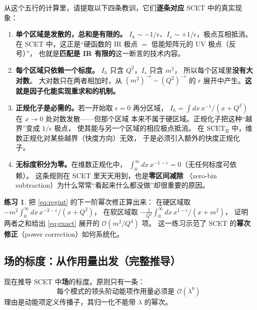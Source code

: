 \documentclass[UTF8,a4paper,11pt]{ctexart}
\theoremstyle{definition}
\newtheorem{exercise}{练习}[section]
\theoremstyle{remark}
\theoremstyle{plain}
\newcommand{\SCETII}{\text{SCET}_{\mathrm{II}}}
\newcommand{\en}[1]{\textsf{#1}}   %
\begin{document}
从这个五行的计算里，请提取以下四条教训，它们\textbf{逐条对应} SCET 中的真实现象：

\begin{enumerate}[label=(\arabic*)]
  \item \textbf{单个区域是发散的，总和是有限的。}
        $I_h\sim-1/\epsilon$、$I_s\sim+1/\epsilon$，极点互相抵消。
        在 SCET 中，这正是“硬函数的 IR 极点 $=$ 低能矩阵元的 UV 极点（反号）”，
        也就是\textbf{匹配是 IR 有限的}这一断言的技术内容。
  \item \textbf{每个区域只依赖一个标度。}
        $I_h$ 只含 $Q^2$，$I_s$ 只含 $m^2$，
        所以每个区域里\textbf{没有大对数}。
        大对数只在两者相加时，从 $(m^2)^{-\epsilon}-(Q^2)^{-\epsilon}$ 的
        $\epsilon$ 展开中产生。\textbf{这就是因子化能实现重求和的机制。}
  \item \textbf{正规化子是必需的。}若一开始取 $\epsilon=0$ 再分区域，
        $I_h=\int dx\,x^{-1}/(x+Q^2)$ 在 $x\to0$ 处对数发散——但那个区域
        本来不属于硬区域。正规化子把这种“越界”变成 $1/\epsilon$ 极点，
        使其能与另一个区域的相应极点抵消。
        在 $\SCETII$ 中，维数正规化对某些越界（快度方向）无效，
        于是必须引入额外的快度正规化子。
  \item \textbf{无标度积分为零。}在维数正规化中，
        $\int_0^\infty dx\,x^{-1-\epsilon}=0$（无任何标度可依赖）。
        这条规则在 SCET 里天天用到，也是\textbf{零区间减除}
        （\en{zero-bin subtraction}）为什么常常“看起来什么都没做”却很重要的原因。
\end{enumerate}

\begin{exercise}
把 \eqref{eq:regint} 的下一阶幂次修正算出来：
在硬区域取 $-m^2\!\int_0^\infty dx\,x^{-2-\epsilon}/(x+Q^2)$，
在软区域取 $-\frac{1}{Q^4}\!\int_0^\infty dx\,x^{1-\epsilon}/(x+m^2)$，
证明两者之和给出 \eqref{eq:exact} 展开的 $\mathcal O(m^2/Q^4)$ 项。
这一练习示范了 SCET 的\textbf{幂次修正}（\en{power correction}）如何系统化。
\end{exercise}

\subsection{场的标度：从作用量出发（完整推导）}
\label{subsec:fieldscaling}

现在推导 SCET 中\textbf{场}的标度。原则只有一条：
\begin{equation}
  \boxed{\;\text{每个模式的领头阶动能项作用量必须是 }\mathcal O(\lambda^0)\;}
  \label{eq:actionrule}
\end{equation}
理由是动能项定义传播子，其归一化不能带 $\lambda$ 的幂次。
\end{document}
